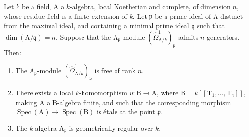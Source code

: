 \begin{corollary}[18.11.9]
\label{IV.18.11.9}
Let $k$ be a field, $\mathrm{A}$ a $k$-algebra, local Noetherian and complete, of dimension $n$, whose residue field is a finite extension of $k$.
Let $\mathfrak{p}$ be a prime ideal of $\mathrm{A}$ distinct from the maximal ideal, and containing a minimal prime ideal $\mathfrak{q}$ such that $\dim(\mathrm{A}/\mathfrak{q})=n$.
Suppose that the $\mathrm{A}_\mathfrak{p}$-module $(\hat{\Omega}^1_{\mathrm{A}/k})_\mathfrak{p}$ admits $n$ generators.
Then:
\begin{enumerate}[label=(\roman*)]
  \item The $\mathrm{A}_\mathfrak{p}$-module $(\hat{\Omega}^1_{\mathrm{A}/k})_\mathfrak{p}$ is free of rank $n$.
  \item There exists a local $k$-homomorphism $u:\mathrm{B}\to\mathrm{A}$, where $\mathrm{B}=k[[\mathrm{T}_1,\ldots,\mathrm{T}_n]]$, making $\mathrm{A}$ a $\mathrm{B}$-algebra finite, and such that the corresponding morphism $\operatorname{Spec}(\mathrm{A})\to\operatorname{Spec}(\mathrm{B})$ is \'etale at the point $\mathfrak{p}$.
  \item The $k$-algebra $\mathrm{A}_\mathfrak{p}$ is geometrically regular over $k$.
\end{enumerate}
\end{corollary}

